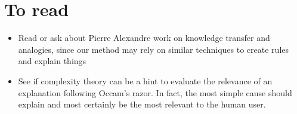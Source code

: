 \documentclass{article}
\begin{document}
    
    \section{To read}
    \begin{itemize}
        \item Read or ask about Pierre Alexandre work on knowledge transfer and analogies, since our method may rely on similar techniques to create rules and explain things

        \item See if complexity theory can be a hint to evaluate the relevance of an explanation following Occam's razor. In fact, the most simple cause should explain and most certainly be the most relevant to the human user.
    \end{itemize}
    
\newpage


\end{document}
